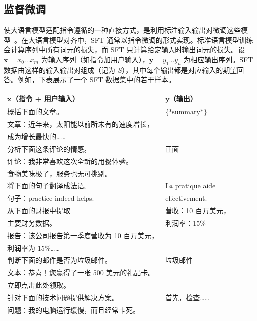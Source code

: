\subsection{监督微调}

\noindent 使大语言模型适配指令遵循的一种直接方式，是利用标注输入输出对微调这些模型~\cite{ouyang-etal:2022training,wei-etal:2022finetuned}。在大语言模型对齐中，SFT 通常以指令微调的形式实现。标准语言模型训练会计算序列中所有词元的损失，而 SFT 只计算给定输入时输出词元的损失。设 $\mathbf{x}=x_0...x_m$ 为输入序列（如指令加用户输入），$\mathbf{y}=y_1...y_n$ 为相应输出序列。SFT 数据由这样的输入输出对组成（记为 $S$），其中每个输出都是对应输入的期望回答。例如，下表展示了一个 SFT 数据集中的若干样本。

\begin{center}
\begin{tabular}{l | l}
$\mathbf{x}$（指令 + 用户输入） & $\mathbf{y}$（输出） \\ \hline
\colorbox{gray!30}{概括下面的文章。} & $\{*\textrm{summary}*\}$ \\
文章：近年来，太阳能以前所未有的速度增长， & \\
成为增长最快的…… & \\ \hline
\colorbox{gray!30}{分析下面这条评论的情感。} & 正面 \\
评论：我非常喜欢这次全新的用餐体验。 & \\
食物美味极了，服务也无可挑剔。 & \\ \hline
\colorbox{gray!30}{将下面的句子翻译成法语。} & La pratique aide \\
句子：practice indeed helps. & effectivement. \\ \hline
\colorbox{gray!30}{从下面的财报中提取} & 营收：10 百万美元，\\
\colorbox{gray!30}{主要财务数据。} & 利润率：15\% \\
报告：该公司报告第一季度营收为 10 百万美元，\\
利润率为 15\%…… \\ \hline
\colorbox{gray!30}{判断下面的邮件是否为垃圾邮件。} & 垃圾邮件 \\
文本：恭喜！您赢得了一张 500 美元的礼品卡。\\
立即点击此处领取。 \\ \hline
\colorbox{gray!30}{针对下面的技术问题提供解决方案。} & 首先，检查…… \\
问题：我的电脑运行缓慢，而且经常卡死。 &
\end{tabular}
\end{center}

